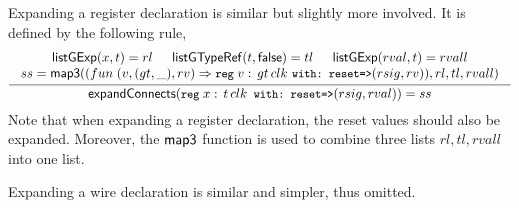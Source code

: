 Expanding a register declaration is similar but slightly more involved. It is defined by the following rule, 
%
\begin{gather*}
  \label{expand-reg}
  \infer[]
        {\seqq{\expandconnects (\mbox{\prettyll{reg}}\; x:\,t\,clk\,\mbox{ \prettyll{with: reset=> }}(rsig, rval)) = ss}}
        {\begin{array}{c}
            \listgexp(x, t) = rl \hspace{15pt} \listgtyperef(t, \lfalse) = tl    \hspace{15pt}  \listgexp(rval, t) = rvall \\
            ss= \fmapthree((fun\; (v,(gt,\_),rv) \Rightarrow \mbox{\prettyll{reg}}\; v:\,gt\,clk \mbox{ \prettyll{with: reset=>}} (rsig, rv)), rl,tl,rvall)
          \end{array}
        }
\end{gather*}
Note that when expanding a register declaration, the reset values should also be expanded. Moreover, the ${\sf map3}$ function is used to combine three lists $rl, tl, rvall$ into one list. 

Expanding a wire declaration is similar and simpler, thus omitted. 




